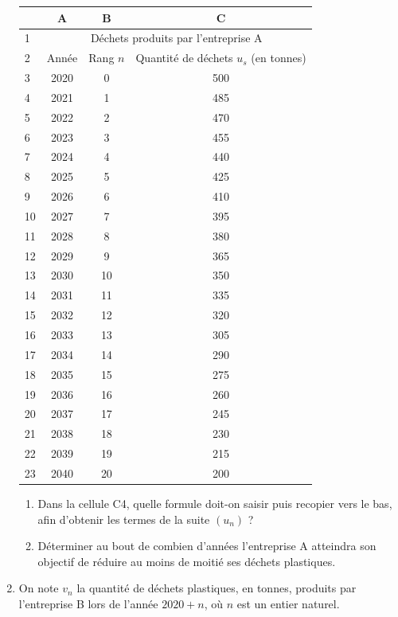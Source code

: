 \begin{enumerate}
\begin{center}
\begin{tabular}{|l|c|c|c|}
\hline
 & A & B & C \\
\hline
1 & \multicolumn{3}{|c|}{Déchets produits par l'entreprise A} \\
\hline
2 & Année & Rang $n$ & Quantité de déchets $u_{s}$ (en tonnes) \\
\hline
3 & 2020 & 0 & 500 \\
\hline
4 & 2021 & 1 & 485 \\
\hline
5 & 2022 & 2 & 470 \\
\hline
6 & 2023 & 3 & 455 \\
\hline
7 & 2024 & 4 & 440 \\
\hline
8 & 2025 & 5 & 425 \\
\hline
9 & 2026 & 6 & 410 \\
\hline
10 & 2027 & 7 & 395 \\
\hline
11 & 2028 & 8 & 380 \\
\hline
12 & 2029 & 9 & 365 \\
\hline
13 & 2030 & 10 & 350 \\
\hline
14 & 2031 & 11 & 335 \\
\hline
15 & 2032 & 12 & 320 \\
\hline
16 & 2033 & 13 & 305 \\
\hline
17 & 2034 & 14 & 290 \\
\hline
18 & 2035 & 15 & 275 \\
\hline
19 & 2036 & 16 & 260 \\
\hline
20 & 2037 & 17 & 245 \\
\hline
21 & 2038 & 18 & 230 \\
\hline
22 & 2039 & 19 & 215 \\
\hline
23 & 2040 & 20 & 200 \\
\hline
\end{tabular}
\end{center}
	\begin{enumerate}[resume]
		\item  Dans la cellule \textsf{C4}, quelle formule doit-on saisir puis recopier vers le bas, afin d'obtenir les termes de la suite $\left(u_{n}\right)$ ?
		\item  Déterminer au bout de combien d'années l'entreprise A atteindra son objectif de réduire au moins de moitié ses déchets plastiques.
	\end{enumerate}
\item On note $v_{n}$ la quantité de déchets plastiques, en tonnes, produits par l'entreprise B lors de l'année $2020+n$, où $n$ est un entier naturel.


\end{enumerate}
